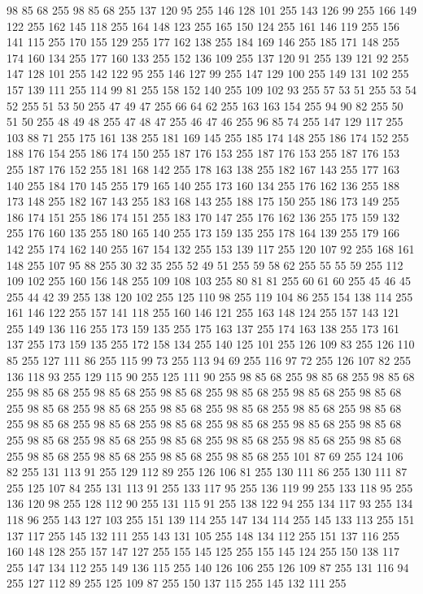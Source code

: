 98 85 68 255 98 85 68 255 137 120 95 255 146 128 101 255 143 126 99 255 166 149 122 255 162 145 118 255 164 148 123 255 165 150 124 255 161 146 119 255 156 141 115 255 170 155 129 255 177 162 138 255 184 169 146 255 185 171 148 255 174 160 134 255 177 160 133 255 152 136 109 255 137 120 91 255 139 121 92 255 147 128 101 255 142 122 95 255 146 127 99 255 147 129 100 255 149 131 102 255 157 139 111 255 114 99 81 255 158 152 140 255 109 102 93 255 57 53 51 255 53 54 52 255 51 53 50 255 47 49 47 255 66 64 62 255 163 163 154 255 94 90 82 255 50 51 50 255 48 49 48 255 47 48 47 255 46 47 46 255 96 85 74 255 147 129 117 255 103 88 71 255 175 161 138 255 181 169 145 255 185 174 148 255 186 174 152 255 188 176 154 255 186 174 150 255 187 176 153 255 187 176 153 255 187 176 153 255 187 176 152 255 181 168 142 255 178 163 138 255 182 167 143 255 177 163 140 255 184 170 145 255 179 165 140 255 173 160 134 255 176 162 136 255 188 173 148 255 182 167 143 255 183 168 143 255
188 175 150 255 186 173 149 255 186 174 151 255 186 174 151 255 183 170 147 255 176 162 136 255 175 159 132 255 176 160 135 255 180 165 140 255 173 159 135 255 178 164 139 255 179 166 142 255 174 162 140 255 167 154 132 255 153 139 117 255 120 107 92 255 168 161 148 255 107 95 88 255 30 32 35 255 52 49 51 255 59 58 62 255 55 55 59 255 112 109 102 255 160 156 148 255 109 108 103 255 80 81 81 255 60 61 60 255 45 46 45 255 44 42 39 255 138 120 102 255 125 110 98 255 119 104 86 255 154 138 114 255 161 146 122 255 157 141 118 255 160 146 121 255 163 148 124 255 157 143 121 255 149 136 116 255 173 159 135 255 175 163 137 255 174 163 138 255 173 161 137 255 173 159 135 255 172 158 134 255 140 125 101 255 126 109 83 255 126 110 85 255 127 111 86 255 115 99 73 255 113 94 69 255 116 97 72 255 126 107 82 255 136 118 93 255 129 115 90 255 125 111 90 255 98 85 68 255 98 85 68 255 98 85 68 255 98 85 68 255 98 85 68 255 98 85 68 255 98 85 68 255 98 85 68 255
98 85 68 255 98 85 68 255 98 85 68 255 98 85 68 255 98 85 68 255 98 85 68 255 98 85 68 255 98 85 68 255 98 85 68 255 98 85 68 255 98 85 68 255 98 85 68 255 98 85 68 255 98 85 68 255 98 85 68 255 98 85 68 255 98 85 68 255 98 85 68 255 98 85 68 255 98 85 68 255 98 85 68 255 98 85 68 255 98 85 68 255 101 87 69 255 124 106 82 255 131 113 91 255 129 112 89 255 126 106 81 255 130 111 86 255 130 111 87 255 125 107 84 255 131 113 91 255 133 117 95 255 136 119 99 255 133 118 95 255 136 120 98 255 128 112 90 255 131 115 91 255 138 122 94 255 134 117 93 255 134 118 96 255 143 127 103 255 151 139 114 255 147 134 114 255 145 133 113 255 151 137 117 255 145 132 111 255 143 131 105 255 148 134 112 255 151 137 116 255 160 148 128 255 157 147 127 255 155 145 125 255 155 145 124 255 150 138 117 255 147 134 112 255 149 136 115 255 140 126 106 255 126 109 87 255 131 116 94 255 127 112 89 255 125 109 87 255 150 137 115 255 145 132 111 255

